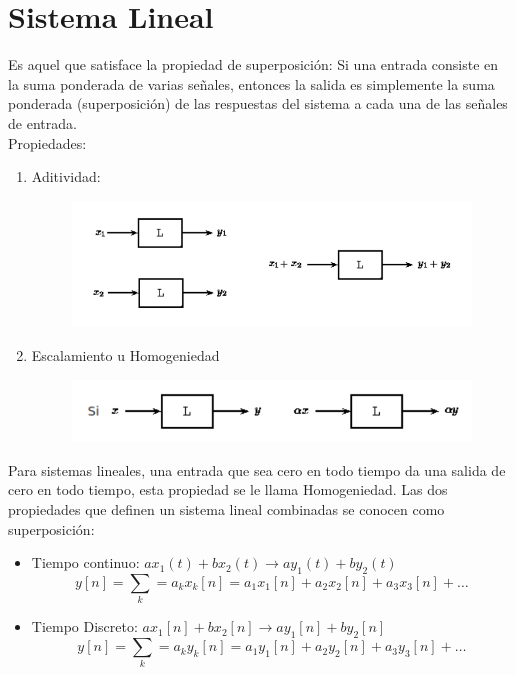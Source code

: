 \documentclass{article}
\author{Jorge Gómez Reus}
\date{}
\begin{document}
\maketitle
\tableofcontents
\section{Sistema Lineal}
Es aquel que satisface la propiedad de superposición: Si una entrada consiste en la suma ponderada de varias señales, entonces la salida es simplemente la suma ponderada (superposición) de las respuestas del sistema a cada una de las señales de entrada.\\
Propiedades: 
\begin{enumerate}
	\item Aditividad:\\
	\begin{figure}[h!]
		\centering
		\includegraphics[scale=.65]{img/aditivity}
	\end{figure} 
	\item Escalamiento u Homogeniedad
	\begin{figure}[h!]
		\centering
		\includegraphics[scale=.65]{img/proportionality}
	\end{figure} 
\end{enumerate}
Para sistemas lineales, una entrada que sea cero en todo tiempo da una salida de cero en todo tiempo, esta propiedad se le llama Homogeniedad.
Las dos propiedades que definen un sistema lineal combinadas se conocen como superposición:
\begin{itemize}
	\item Tiempo continuo: $ax_1(t) + bx_2(t) \rightarrow ay_1(t) + by_2(t)$\\
	$$y[n] = \sum_{k}=a_{k}x_{k}[n] = a_1x_1[n] + a_2x_2[n] + a_3x_3[n] + \ldots$$
	\item Tiempo Discreto: $ax_1[n] + bx_2[n] \rightarrow ay_1[n] + by_2[n]$\\
	$$y[n] = \sum_{k}=a_{k}y_{k}[n] = a_1y_1[n] + a_2y_2[n] + a_3y_3[n] + \ldots$$
\end{itemize}
\end{document}
